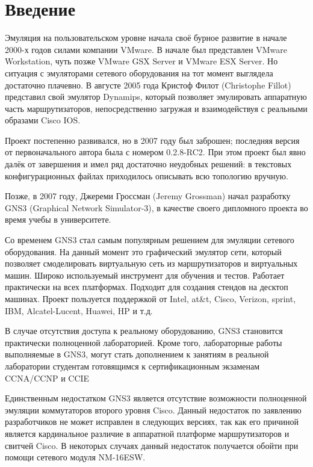 \newpage
\section*{Введение}

Эмуляция на пользовательском уровне начала своё бурное развитие в начале 2000-х годов силами компании VMware. В начале был представлен VMware Workstation, чуть позже VMware GSX Server и VMware ESX Server. Но ситуация с эмуляторами сетевого оборудования на тот момент выглядела достаточно плачевно.
В августе 2005 года Кристоф Филот (Christophe Fillot) представил свой эмулятор Dynamips, который позволяет эмулировать аппаратную часть маршрутизаторов, непосредственно загружая и взаимодействуя с реальными образами Cisco IOS. 

Проект постепенно развивался, но в 2007 году был заброшен; последняя версия от первоначального автора была с номером 0.2.8-RC2. При этом проект был явно далёк от завершения и имел ряд достаточно неудобных решений: в текстовых конфигурационных файлах приходилось описывать всю топологию вручную.

Позже, в 2007 году, Джереми Гроссман (Jeremy Grossman) начал разработку GNS3 (Graphical Network Simulator-3), в качестве своего дипломного проекта во время учебы в университете.

Со временем GNS3 стал самым популярным решением для эмуляции сетевого оборудования. На данный момент это графический эмулятор сети, который позволяет смоделировать виртуальную сеть из маршрутизаторов и виртуальных машин. Широко используемый инструмент для обучения и тестов. Работает практически на всех платформах. Подходит для создания стендов на десктоп машинах. Проект пользуется поддержкой от Intel, at\&t, Cisco, Verizon, sprint, IBM, Alcatel-Lucent, Huawei, HP и т.д.

В случае отсутствия доступа к реальному оборудованию, GNS3 становится практически полноценной лабораторией. Кроме того, лабораторные работы выполняемые в GNS3, могут стать дополнением к занятиям в реальной лаборатории студентам готовящимся к сертификационным экзаменам CCNA/CCNP и CCIE

Единственным недостатком GNS3  является отсутствие возможности полноценной эмуляции коммутаторов второго уровня Cisco. Данный недостаток по заявлению разработчиков не может исправлен в следующих версиях, так как его причиной является кардинальное различие в аппаратной платформе маршрутизаторов и свитчей Cisco. В некоторых случаях данный недостаток получается обойти при помощи сетевого модуля NM-16ESW.

